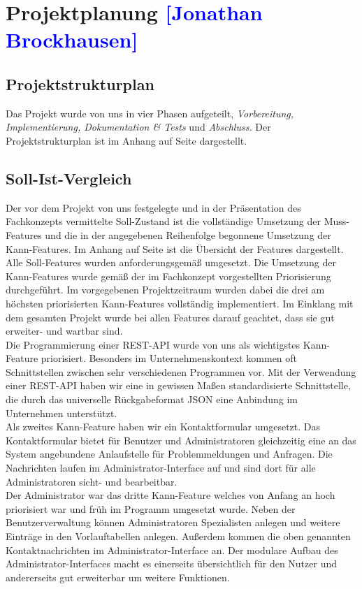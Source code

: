 

\section{Projektplanung \textcolor{blue}{[Jonathan Brockhausen]}}

\subsection{Projektstrukturplan}
Das Projekt wurde von uns in vier Phasen aufgeteilt, \textit{Vorbereitung, Implementierung, Dokumentation \& Tests} und \textit{Abschluss.}
Der Projektstrukturplan ist im Anhang auf Seite \pageref{PSP} dargestellt.

\subsection{Soll-Ist-Vergleich}
Der vor dem Projekt von uns festgelegte und in der Präsentation des Fachkonzepts vermittelte Soll-Zustand ist die vollständige Umsetzung der Muss-Features und die in der angegebenen Reihenfolge begonnene Umsetzung der Kann-Features.
Im Anhang auf Seite \pageref{PM_SOLLIST} ist die Übersicht der Features dargestellt. Alle Soll-Features wurden anforderungsgemäß umgesetzt. Die Umsetzung der Kann-Features wurde gemäß der im Fachkonzept vorgestellten Priorisierung durchgeführt. Im vorgegebenen Projektzeitraum wurden dabei die drei am höchsten priorisierten Kann-Features vollständig implementiert. Im Einklang mit dem gesamten Projekt wurde bei allen Features darauf geachtet, dass sie gut erweiter- und wartbar sind.\\
Die Programmierung einer REST-API wurde von uns als wichtigstes Kann-Feature priorisiert. Besonders im Unternehmenskontext kommen oft Schnittstellen zwischen sehr verschiedenen Programmen vor. Mit der Verwendung einer REST-API haben wir eine in gewissen Maßen standardisierte Schnittstelle, die durch das universelle Rückgabeformat JSON eine Anbindung im Unternehmen unterstützt. \\
Als zweites Kann-Feature haben wir ein Kontaktformular umgesetzt. Das Kontaktformular bietet für Benutzer und Administratoren gleichzeitig eine an das System angebundene Anlaufstelle für Problemmeldungen und Anfragen. Die Nachrichten laufen im Administrator-Interface auf und sind dort für alle Administratoren sicht- und bearbeitbar.\\
Der Administrator war das dritte Kann-Feature welches von Anfang an hoch priorisiert war und früh im Programm umgesetzt wurde. Neben der Benutzerverwaltung können Administratoren Spezialisten anlegen und weitere Einträge in den Vorlauftabellen anlegen. Außerdem kommen die oben genannten Kontaktnachrichten im Administrator-Interface an. Der modulare Aufbau des Administrator-Interfaces macht es einerseits übersichtlich für den Nutzer und andererseits gut erweiterbar um weitere Funktionen.\\
